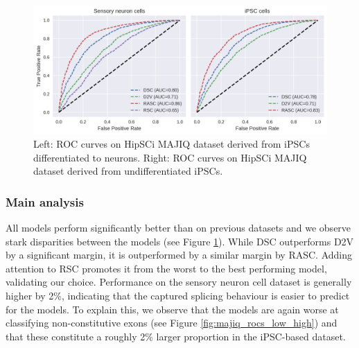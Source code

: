 \begin{figure}
	\centering\includegraphics[width=1\textwidth]{../visualizations/ch5-results/majiq_neuron_ipsc_cross_model_roc_auc_comparison.png} 
	\caption{Left: ROC curves on HipSCi MAJIQ dataset derived from iPSCs differentiated to neurons. Right: ROC curves on HipSCi MAJIQ dataset derived from undifferentiated iPSCs. }
	\label{fig:majiq_rocs}
\end{figure}

\subsubsection{Main analysis}
All models perform significantly better than on previous datasets and we observe stark disparities between the models (see Figure \ref{fig:majiq_rocs}). While DSC outperforms D2V by a significant margin, it is outperformed by a similar margin by RASC. Adding attention to RSC promotes it from the worst to the best performing model, validating our choice. Performance on the sensory neuron cell dataset is generally higher by 2\%, indicating that the captured splicing behaviour is easier to predict for the models. To explain this, we observe that the models are again worse at classifying non-constitutive exons (see Figure \ref{fig:majiq_rocs_low_high}) and that these constitute a roughly 2\% larger proportion in the iPSC-based dataset. 





